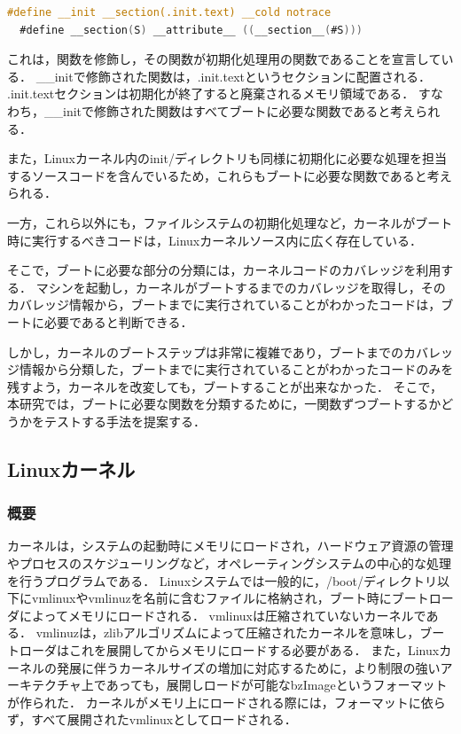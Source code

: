 \documentclass[graduation-thesis]{mlarticle}
\begin{document}
\begin{lstlisting}[language=C, caption=\_\_initマクロの定義, label=code:__init]
  #define __init __section(.init.text) __cold notrace
  #define __section(S) __attribute__ ((__section__(#S)))
\end{lstlisting}

これは，関数を修飾し，その関数が初期化処理用の関数であることを宣言している．
\_\_initで修飾された関数は，.init.textというセクションに配置される．
.init.textセクションは初期化が終了すると廃棄されるメモリ領域である．
すなわち，\_\_initで修飾された関数はすべてブートに必要な関数であると考えられる．

また，Linuxカーネル内のinit/ディレクトリも同様に初期化に必要な処理を担当するソースコードを含んでいるため，これらもブートに必要な関数であると考えられる．

一方，これら以外にも，ファイルシステムの初期化処理など，カーネルがブート時に実行するべきコードは，Linuxカーネルソース内に広く存在している．

そこで，ブートに必要な部分の分類には，カーネルコードのカバレッジを利用する．
マシンを起動し，カーネルがブートするまでのカバレッジを取得し，そのカバレッジ情報から，ブートまでに実行されていることがわかったコードは，ブートに必要であると判断できる．

しかし，カーネルのブートステップは非常に複雑であり，ブートまでのカバレッジ情報から分類した，ブートまでに実行されていることがわかったコードのみを残すよう，カーネルを改変しても，ブートすることが出来なかった．
そこで，本研究では，ブートに必要な関数を分類するために，一関数ずつブートするかどうかをテストする手法を提案する．

\subsection{Linuxカーネル}
\label{propo:linux}

\subsubsection{概要}
カーネルは，システムの起動時にメモリにロードされ，ハードウェア資源の管理やプロセスのスケジューリングなど，オペレーティングシステムの中心的な処理を行うプログラムである．
Linuxシステムでは一般的に，/boot/ディレクトリ以下にvmlinuxやvmlinuzを名前に含むファイルに格納され，ブート時にブートローダによってメモリにロードされる．
vmlinuxは圧縮されていないカーネルである．
vmlinuzは，zlibアルゴリズムによって圧縮されたカーネルを意味し，ブートローダはこれを展開してからメモリにロードする必要がある．
また，Linuxカーネルの発展に伴うカーネルサイズの増加に対応するために，より制限の強いアーキテクチャ上であっても，展開しロードが可能なbzImageというフォーマットが作られた．
カーネルがメモリ上にロードされる際には，フォーマットに依らず，すべて展開されたvmlinuxとしてロードされる．
\end{document}
